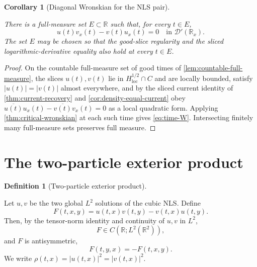 \documentclass[11pt,oneside]{book}
\providecommand{\uses}[1]{}
\newtheorem{corollary}[theorem]{Corollary}
\theoremstyle{definition}
\newtheorem{definition}[theorem]{Definition}
\theoremstyle{remark}
\newcommand{\R}{\mathbb R}
\newcommand{\D}{\mathcal D}
\newcommand{\1}{\mathbf 1}
\newcommand{\loc}{\mathrm{loc}}
\begin{document}
\begin{corollary}[Diagonal Wronskian for the NLS pair]\label{cor:diagonal-W}
\uses{thm:critical-wronskian}
There is a full-measure set $E\subset\R$ such that, for every $t\in E$,
\begin{equation}
 u(t)v_x(t)-v(t)u_x(t)=0\quad\text{in }\D'(\R_x).    \label{eq:time-W}
\end{equation}
The set $E$ may be chosen so that the good-slice regularity and the sliced
logarithmic-derivative equality also hold at every $t\in E$.
\end{corollary}

\begin{proof}
\uses{thm:critical-wronskian, thm:current-recovery, lem:countable-full-measure, cor:density-equal-current}
On the countable full-measure set of good times of
\cref{lem:countable-full-measure}, the slices $u(t),v(t)$ lie in
$H^{1/2}_{\loc}\cap C$ and are locally bounded, satisfy $|u(t)|=|v(t)|$
almost everywhere, and by the sliced current identity of
\cref{thm:current-recovery} and \cref{cor:density-equal-current} obey
$\overline{u(t)}u_x(t)-\overline{v(t)}v_x(t)=0$ as a local quadratic form.
Applying \cref{thm:critical-wronskian} at each such time gives
\eqref{eq:time-W}. Intersecting finitely many full-measure sets preserves
full measure.
\end{proof}

\section{The two-particle exterior product}

\begin{definition}[Two-particle exterior product]\label{def:exterior-product}
\uses{def:fixed-point-space}
Let $u,v$ be the two global $L^2$ solutions of the cubic NLS. Define
\begin{equation}
 F(t,x,y)=u(t,x)v(t,y)-v(t,x)u(t,y).                 \label{eq:F-def}
\end{equation}
Then, by the tensor-norm identity and continuity of $u,v$ in $L^2$,
\begin{equation}
 F\in C(\R;L^2(\R^2)),                               \label{eq:F-C-L2}
\end{equation}
and $F$ is antisymmetric,
\begin{equation}
 F(t,y,x)=-F(t,x,y).                                 \label{eq:F-antisym}
\end{equation}
We write $\rho(t,x)=|u(t,x)|^2=|v(t,x)|^2$.
\end{definition}
\end{document}
